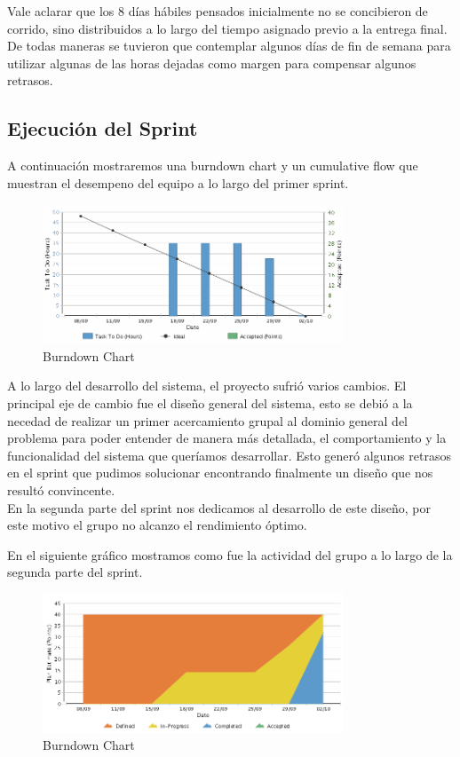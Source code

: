\indent Vale aclarar que los 8 días hábiles pensados inicialmente no se concibieron de corrido, sino distribuidos a lo largo del tiempo asignado previo a la entrega final. De todas maneras se tuvieron que contemplar algunos días de fin de semana para utilizar algunas de las horas dejadas como margen para compensar algunos retrasos.

\subsection{Ejecución del Sprint}

A continuación mostraremos una burndown chart y un cumulative flow que muestran el desempeno del equipo a lo largo del primer sprint.

\begin{figure}[h!]
  \centering
  \includegraphics[width=0.8\textwidth]{./imagenes/burn_down.png}
  \caption{Burndown Chart}
  \label{fig:burn_down_chart}
\end{figure} 

A lo largo del desarrollo del sistema, el proyecto sufrió varios cambios. El principal eje de cambio fue el diseño general del sistema, esto se debió a la necedad de realizar un primer acercamiento grupal al dominio general del problema para poder entender de manera más detallada, el comportamiento y la funcionalidad del sistema que queríamos desarrollar. Esto generó algunos retrasos en el sprint que pudimos solucionar encontrando finalmente un diseño que nos resultó convincente. \\
En la segunda parte del sprint nos dedicamos al desarrollo de este diseño, por este motivo el grupo no alcanzo el rendimiento óptimo.

En el siguiente gráfico mostramos como fue la actividad del grupo a lo largo de la segunda parte del sprint.

\begin{figure}[h!]
  \centering
  \includegraphics[width=0.8\textwidth]{./imagenes/cumulative_flow.png}
  \caption{Burndown Chart}
  \label{fig:cumulative_flow}
\end{figure} 



